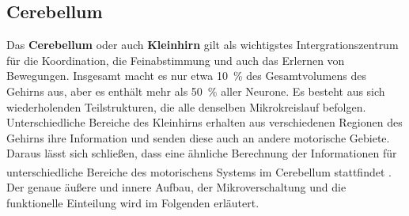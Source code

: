 \subsection{Cerebellum} \label{sub:kleinhirn} 
Das \textbf{Cerebellum} oder auch \textbf{Kleinhirn} gilt als wichtigstes Intergrationszentrum für die Koordination, die Feinabstimmung und auch das Erlernen von Bewegungen. Insgesamt macht es nur etwa 10~\% des Gesamtvolumens des Gehirns aus, aber es enthält mehr als 50~\% aller Neurone. Es besteht aus sich wiederholenden Teilstrukturen, die alle denselben Mikrokreislauf befolgen. Unterschiedliche Bereiche des Kleinhirns erhalten aus verschiedenen Regionen des Gehirns ihre Information und senden diese auch an andere motorische Gebiete. Daraus lässt sich schließen, dass eine ähnliche Berechnung der Informationen für unterschiedliche Bereiche des motorischens Systems im Cerebellum stattfindet \textsuperscript{\cite[Kap.~42]{kandel2013principles}}. Der genaue äußere und innere Aufbau, der Mikroverschaltung und die funktionelle Einteilung wird im Folgenden erläutert.    

